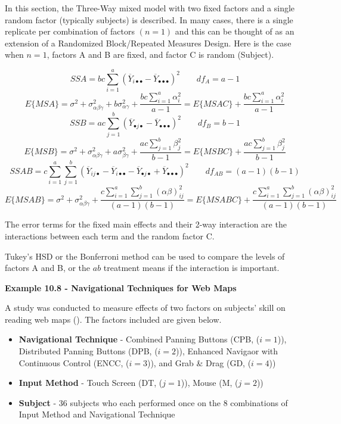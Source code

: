 \documentclass[
]{book}
\providecommand{\tightlist}{%
  \setlength{\itemsep}{0pt}\setlength{\parskip}{0pt}}
\begin{document}
In this section, the Three-Way mixed model with two fixed factors and a
single random factor (typically subjects) is described. In many cases,
there is a single replicate per combination of factors \((n=1)\) and
this can be thought of as an extension of a Randomized Block/Repeated
Measures Design. Here is the case when \(n=1\), factors A and B are
fixed, and factor C is random (Subject).

\[
SSA = bc\sum_{i=1}^a\left(\overline{Y}_{i\bullet\bullet}-
\overline{Y}_{\bullet\bullet\bullet}\right)^2
\qquad df_A=a-1  
\] \[
E\{MSA\}=\sigma^2 + \sigma_{\alpha\beta\gamma}^2+
b\sigma_{\alpha\gamma}^2+\frac{bc\sum_{i=1}^a\alpha_i^2}{a-1}
=E\{MSAC\}+\frac{bc\sum_{i=1}^a\alpha_i^2}{a-1}
\] \[
SSB = ac\sum_{j=1}^b\left(\overline{Y}_{\bullet j\bullet}-
\overline{Y}_{\bullet\bullet\bullet}\right)^2
\qquad df_B=b-1  
\] \[
E\{MSB\}=\sigma^2 + \sigma_{\alpha\beta\gamma}^2+
a\sigma_{\beta\gamma}^2+\frac{ac\sum_{j=1}^b\beta_j^2}{b-1}
= E\{MSBC\}+\frac{ac\sum_{j=1}^b\beta_j^2}{b-1}
\] \[
SSAB=c\sum_{i=1}^a \sum_{j=1}^b \left(
\overline{Y}_{ij\bullet}-\overline{Y}_{i\bullet\bullet}-
\overline{Y}_{\bullet j \bullet} +
\overline{Y}_{\bullet\bullet\bullet} \right)^2
\qquad df_{AB}=(a-1)(b-1)
\] \[
E\{MSAB\}=\sigma^2 + \sigma_{\alpha\beta\gamma}^2 + 
\frac{c\sum_{i=1}^a\sum_{j=1}^b(\alpha\beta)_{ij}^2}{(a-1)(b-1)}
=E\{MSABC\}+
\frac{c\sum_{i=1}^a\sum_{j=1}^b(\alpha\beta)_{ij}^2}{(a-1)(b-1)}
\]

The error terms for the fixed main effects and their 2-way interaction
are the interactions between each term and the random factor C.

Tukey's HSD or the Bonferroni method can be used to compare the levels
of factors A and B, or the \(ab\) treatment means if the interaction is
important.

\textbf{Example 10.8 - Navigational Techniques for Web Maps}

A study was conducted to measure effects of two factors on subjects'
skill on reading web maps (). The factors included are given below.

\begin{itemize}
\tightlist
\item
  \textbf{Navigational Technique} - Combined Panning Buttons (CPB,
  (\(i=1\))), Distributed Panning Buttons (DPB, (\(i=2\))), Enhanced
  Navigaor with Continuous Control (ENCC, (\(i=3\))), and Grab \& Drag
  (GD, (\(i=4\)))
\item
  \textbf{Input Method} - Touch Screen (DT, (\(j=1\))), Mouse (M,
  (\(j=2\)))
\item
  \textbf{Subject} - 36 subjects who each performed once on the 8
  combinations of Input Method and Navigational Technique
\end{itemize}
\end{document}
